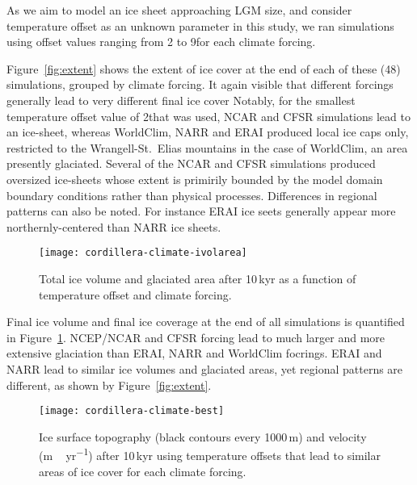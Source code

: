 As we aim to model an ice sheet approaching LGM size, and consider temperature offset as an unknown parameter in this study, we ran simulations using offset values ranging from 2 to 9\degC for each climate forcing.

Figure~\ref{fig:extent} shows the extent of ice cover at the end of each of these (48) simulations, grouped by climate forcing. It again visible that different forcings generally lead to very different final ice cover Notably, for the smallest temperature offset value of 2\degC that was used, NCAR and CFSR simulations lead to an ice-sheet, whereas WorldClim, NARR and ERAI produced local ice caps only, restricted to the Wrangell-St.~Elias mountains in the case of WorldClim, an area presently glaciated. Several of the NCAR and CFSR simulations produced oversized ice-sheets whose extent is primirily bounded by the model domain boundary conditions rather than physical processes. Differences in regional patterns can also be noted. For instance ERAI ice seets generally appear more northernly-centered than NARR ice sheets.

\begin{figure}[t]
	\vspace*{2mm}
	\begin{center}
		\texttt{[image: cordillera-climate-ivolarea]}
	\end{center}
	\caption{Total ice volume and glaciated area after 10\,kyr as a function of temperature offset and climate forcing.}
	\label{fig:ivolarea}
\end{figure}

Final ice volume and final ice coverage at the end of all simulations is quantified in Figure~\ref{fig:ivolarea}. NCEP/NCAR and CFSR forcing lead to much larger and more extensive glaciation than ERAI, NARR and WorldClim focrings. ERAI and NARR lead to similar ice volumes and glaciated areas, yet regional patterns are different, as shown by Figure~\ref{fig:extent}.

\begin{figure}[t]
	\vspace*{2mm}
	\begin{center}
		\texttt{[image: cordillera-climate-best]}
	\end{center}
	\caption{Ice surface topography (black contours every 1000\,m) and velocity (\unit{m\,yr^{-1}}) after 10\,kyr using temperature offsets that lead to similar areas of ice cover for each climate forcing.}
	\label{fig:best}
\end{figure}

